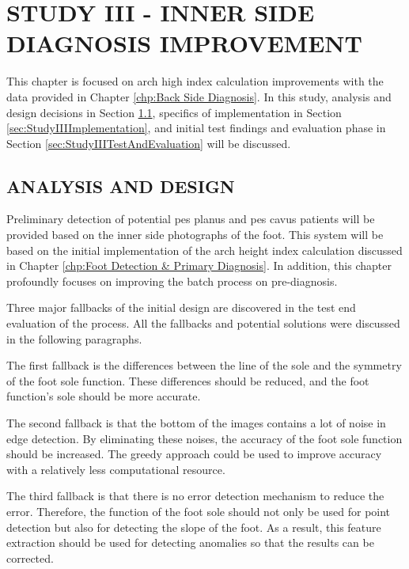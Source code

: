 \chapter{STUDY III - INNER SIDE DIAGNOSIS IMPROVEMENT }\label{chp:Inner Side Diagnosis Improvement}

This chapter is focused on arch high index calculation improvements with the data provided in Chapter \ref{chp:Back Side Diagnosis}. In this study, analysis and design decisions in Section \ref{sec:StudyIIIAnalysisAndDesign}, specifics of implementation in Section \ref{sec:StudyIIIImplementation}, and initial test findings and evaluation phase in Section \ref{sec:StudyIIITestAndEvaluation} will be discussed.

\section{ANALYSIS AND DESIGN}\label{sec:StudyIIIAnalysisAndDesign}

Preliminary detection of potential pes planus and pes cavus patients will be provided based on the inner side photographs of the foot. This system will be based on the initial implementation of the arch height index calculation discussed in Chapter \ref{chp:Foot Detection & Primary Diagnosis}. In addition, this chapter profoundly focuses on improving the batch process on pre-diagnosis.

Three major fallbacks of the initial design are discovered in the test end evaluation of the process. All the fallbacks and potential solutions were discussed in the following paragraphs.

The first fallback is the differences between the line of the sole and the symmetry of the foot sole function. These differences should be reduced, and the foot function's sole should be more accurate.

The second fallback is that the bottom of the images contains a lot of noise in edge detection. By eliminating these noises, the accuracy of the foot sole function should be increased. The greedy approach could be used to improve accuracy with a relatively less computational resource.

The third fallback is that there is no error detection mechanism to reduce the error. Therefore, the function of the foot sole should not only be used for point detection but also for detecting the slope of the foot. As a result, this feature extraction should be used for detecting anomalies so that the results can be corrected.

